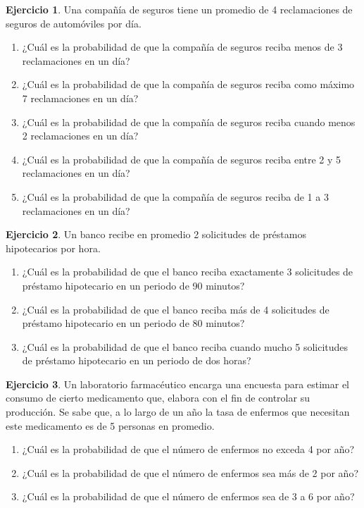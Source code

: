 \documentclass[
  11pt,
]{book}
\providecommand{\tightlist}{%
  \setlength{\itemsep}{0pt}\setlength{\parskip}{0pt}}
\theoremstyle{definition}
\theoremstyle{definition}
\theoremstyle{definition}
\newtheorem{exercise}{Ejercicio}[chapter]
\theoremstyle{definition}
\theoremstyle{remark}
\begin{document}
\begin{exercise}

Una compañía de seguros tiene un promedio de 4 reclamaciones de seguros de automóviles por día.

\begin{enumerate}
\def\labelenumi{\arabic{enumi}.}
\tightlist
\item
  ¿Cuál es la probabilidad de que la compañía de seguros reciba menos de 3 reclamaciones en un día?
\item
  ¿Cuál es la probabilidad de que la compañía de seguros reciba como máximo 7 reclamaciones en un día?
\item
  ¿Cuál es la probabilidad de que la compañía de seguros reciba cuando menos 2 reclamaciones en un día?
\item
  ¿Cuál es la probabilidad de que la compañía de seguros reciba entre 2 y 5 reclamaciones en un día?
\item
  ¿Cuál es la probabilidad de que la compañía de seguros reciba de 1 a 3 reclamaciones en un día?
\end{enumerate}

\end{exercise}

\begin{exercise}

Un banco recibe en promedio 2 solicitudes de préstamos hipotecarios por hora.

\begin{enumerate}
\def\labelenumi{\arabic{enumi}.}
\tightlist
\item
  ¿Cuál es la probabilidad de que el banco reciba exactamente 3 solicitudes de préstamo hipotecario en un periodo de 90 minutos?
\item
  ¿Cuál es la probabilidad de que el banco reciba más de 4 solicitudes de préstamo hipotecario en un periodo de 80 minutos?
\item
  ¿Cuál es la probabilidad de que el banco reciba cuando mucho 5 solicitudes de préstamo hipotecario en un periodo de dos horas?
\end{enumerate}

\end{exercise}

\begin{exercise}

Un laboratorio farmacéutico encarga una encuesta para estimar el consumo de cierto medicamento que, elabora con el fin de controlar su producción. Se sabe que, a lo largo de un año la tasa de enfermos que necesitan este medicamento es de 5 personas en promedio.

\begin{enumerate}
\def\labelenumi{\arabic{enumi}.}
\tightlist
\item
  ¿Cuál es la probabilidad de que el número de enfermos no exceda 4 por año?
\item
  ¿Cuál es la probabilidad de que el número de enfermos sea más de 2 por año?
\item
  ¿Cuál es la probabilidad de que el número de enfermos sea de 3 a 6 por año?
\end{enumerate}

\end{exercise}
\end{document}
